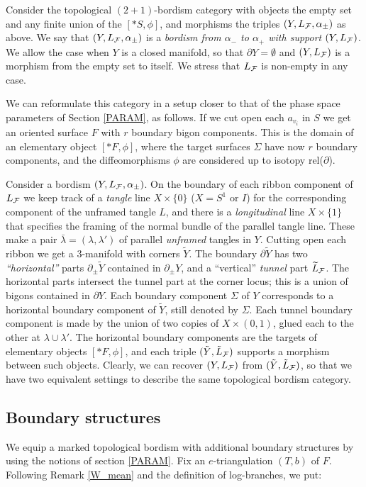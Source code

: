 \smallskip

Consider the topological $(2+1)$-bordism category with objects the
empty set and any finite union of the $[* S,\phi]$, and morphisms the
triples $(Y,L_{\mathcal F},\alpha_\pm)$ as above. We say that
$(Y,L_{\mathcal F},\alpha_\pm)$ is a {\it bordism from $\alpha_-$ to $\alpha_+$
with support $(Y,L_{\mathcal F})$}. We allow the case when $Y$ is a closed
manifold, so that $\partial Y = \emptyset$ and $(Y,L_{\mathcal F})$ is a
morphism from the empty set to itself. We stress that $L_{\mathcal F}$ is
non-empty in any case.

We can reformulate this category in a setup closer to that of the
phase space parameters of Section \ref{PARAM}, as follows. If we cut
open each $a_{v_i}$ in $S$ we get an oriented surface $F$ with $r$
boundary bigon components. This is the domain of an elementary object
$[* F,\phi]$, where the target surfaces $\Sigma$ have now $r$ boundary
components, and the diffeomorphisms $\phi$ are considered up to
isotopy rel($\partial$).

\smallskip

Consider a bordism $(Y,L_{\mathcal F},\alpha_\pm)$. On the boundary of each
ribbon component of $L_{\mathcal F}$ we keep track of a {\it tangle} line
$X\times \{0\}$ ($X=S^1$ or $I$) for the corresponding component of
the unframed tangle $L$, and there is a {\it longitudinal} line
$X\times \{1\}$ that specifies the framing of the normal bundle of the
parallel tangle line. These make a pair
$\bar{\lambda}=(\lambda,\lambda')$ of parallel {\it unframed} tangles
in $Y$. Cutting open each ribbon we get a $3$-manifold with corners
$\tilde{Y}$. The boundary $\partial \tilde{Y}$ has two {\it
  ``horizontal''} parts $\partial_\pm \tilde{Y}$ contained in
$\partial_\pm Y$, and a ``vertical'' {\it tunnel} part $\widetilde
{L}_{\mathcal F}$. The horizontal parts intersect the tunnel part at the corner
locus; this is a union of bigons contained in $\partial Y$. Each
boundary component $\Sigma$ of $Y$ corresponds to a horizontal
boundary component of $\tilde{Y}$, still denoted by $\Sigma$. Each
tunnel boundary component is made by the union of two copies of $X
\times (0,1)$, glued each to the other at $\lambda \cup \lambda'$. The
horizontal boundary components are the targets of elementary objects
$[* F,\phi]$, and each triple $(\tilde{Y},\tilde{L}_{\mathcal F})$ supports a
morphism between such objects. Clearly, we can recover $(Y,L_{\mathcal F})$
from $(\tilde{Y},\tilde{L}_{\mathcal F})$, so that we have two equivalent
settings to describe the same topological bordism category.

\subsection{Boundary structures}\label{QHB-def}
We equip a marked topological bordism with additional boundary
structures by using the notions of section \ref{PARAM}. Fix an
$e$-triangulation $(T,b)$ of $F$. Following Remark \ref{W_mean}
and the definition of log-branches, we put:

